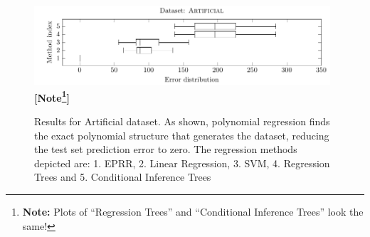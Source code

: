 \documentclass[preprint,authoryear,12pt]{elsarticle}
\newcommand{\note}[1]{\textbf{\small [Note\footnote{\textbf{Note:} #1}]}}
\begin{document}
\begin{figure}[tb]\begin{center}
\includegraphics[width=0.98\textwidth]{figure_2.pdf}
\note{Plots of ``Regression Trees'' and ``Conditional Inference Trees'' look the same!}
\caption{Results for Artificial dataset. As shown, polynomial regression finds the exact polynomial structure that generates the dataset, reducing the test set prediction error to zero.  The regression methods depicted are: 1. \ac{EPRR}, 2. Linear Regression, 3. SVM, 4. Regression Trees and 5. Conditional Inference Trees}
\label{artificial_dataset1_lambda1.0}
\end{center}\end{figure}
\end{document}
